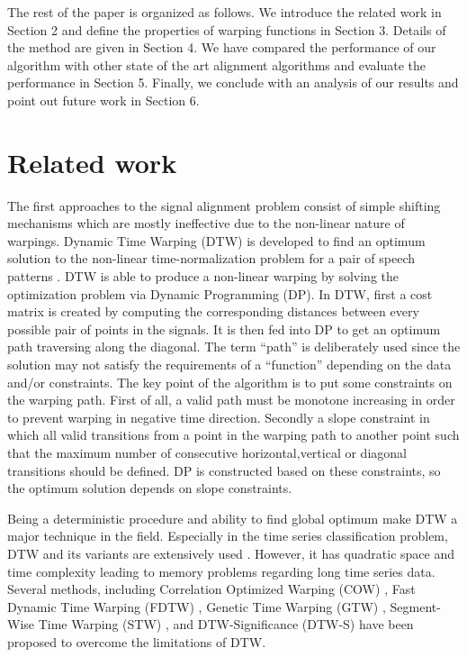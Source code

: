 \documentclass[number,1p,12pt]{elsarticle}
\begin{document}
The rest of the paper is organized as follows. We introduce the related work in Section 2 and define the properties of warping functions in Section 3. Details of the method are given in Section 4. We have compared the performance of our algorithm with other state of the art alignment algorithms and evaluate the performance in Section 5. Finally, we conclude with an analysis of our results and point out future work in Section 6.

\section{Related work}
The first approaches to the signal alignment problem consist of simple shifting mechanisms which are mostly ineffective due to the non-linear nature of warpings. Dynamic Time Warping (DTW) is developed to find an optimum solution to the non-linear time-normalization problem for a pair of speech patterns \cite{Sakoe1978}. DTW is able to produce a non-linear warping by solving the optimization problem via Dynamic Programming (DP). In DTW, first a cost matrix is created by computing the corresponding distances between every possible pair of points in the signals. It is then fed into DP to get an optimum path traversing along the diagonal. The term ``path'' is deliberately used since the solution may not satisfy the requirements of a ``function'' depending on the data and/or constraints. The key point of the algorithm is to put some constraints on the warping path. First of all, a valid path must be monotone increasing in order to prevent warping in negative time direction. Secondly a slope constraint in which all valid transitions from a point in the warping path to another point such that the maximum number of consecutive horizontal,vertical or diagonal transitions should be defined. DP is constructed based on these constraints, so the optimum solution depends on slope constraints.

Being a deterministic procedure and ability to find global optimum make DTW a major technique in the field. Especially in the time series classification problem, DTW and its variants are extensively used \cite{Yu2011,Ratanamahatana2004}. However, it has quadratic space and time complexity leading to memory problems regarding long time series data. Several methods, including Correlation Optimized Warping (COW) \cite{Nielsen1998}, Fast Dynamic Time Warping (FDTW) \cite{Salvadora2007}, Genetic Time Warping (GTW) \cite{Kwong1996}, Segment-Wise Time Warping (STW) \cite{Zhou2005}, and DTW-Significance (DTW-S) \cite{Yuan2011} have been proposed to overcome the limitations of DTW. 
\end{document}
